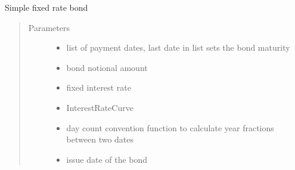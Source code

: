\documentclass[a4paper,10pt,english]{sphinxmanual}
\begin{document}
\begin{fulllineitems}
\begin{quote}
\begin{description}
\begin{itemize}
\end{itemize}

\end{description}\end{quote}

\begin{fulllineitems}
\label{\detokenize{api/Derivate:Derivate.BondCashFlowLegList.__init__}}
\sphinxAtStartPar
Simple fixed rate bond
\begin{quote}\begin{description}
\item[{Parameters}] \leavevmode\begin{itemize}
\item {} 
\sphinxAtStartPar
{} \textendash{} list of payment dates,
last date in list sets the bond maturity

\item {} 
\sphinxAtStartPar
{} \textendash{} bond notional amount

\item {} 
\sphinxAtStartPar
{} \textendash{} fixed interest rate

\item {} 
\sphinxAtStartPar
{} \textendash{} InterestRateCurve

\item {} 
\sphinxAtStartPar
{} \textendash{} day count convention function
to calculate year fractions between two dates

\item {} 
\sphinxAtStartPar
{} \textendash{} issue date of the bond

\end{itemize}

\end{description}\end{quote}

\end{fulllineitems}


\end{fulllineitems}
\end{document}
